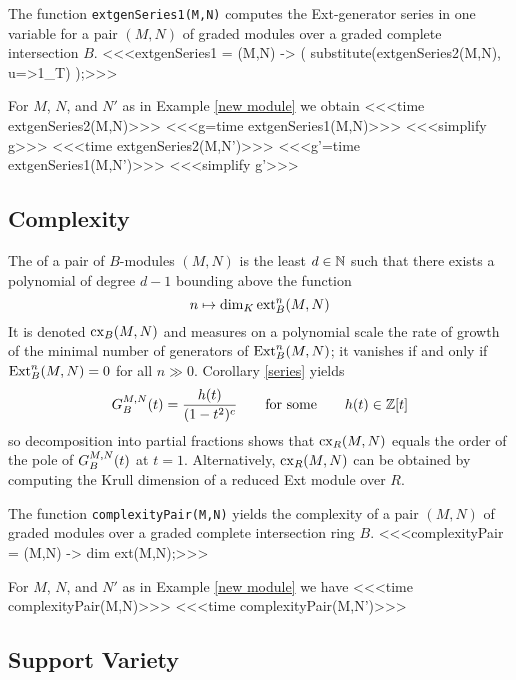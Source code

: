 \begin{sCode}
The function {\tt extgenSeries1(M,N)} computes the Ext-genera\-tor series in
one variable for a pair $(M,N)$ of graded modules over a graded complete
intersection $B$.
<<<extgenSeries1 = (M,N) -> (
   substitute(extgenSeries2(M,N), {u=>1_T})
   );>>>
\end{sCode}

\begin{sExample}
For $M$, $N$, and $N'$ as in Example \ref{new module} we obtain
<<<time extgenSeries2(M,N)>>>
<<<g=time extgenSeries1(M,N)>>>
<<<simplify g>>>
<<<time extgenSeries2(M,N')>>>
<<<g'=time extgenSeries1(M,N')>>>
<<<simplify g'>>>
\end{sExample}

\subsection{Complexity}

The {\it{}\/} of a pair of $B$-modules $(M,N)$
is the least $d\in{\mathbb N}$ such that there exists
a polynomial of degree $d-1$ bounding above the function
\[
n \mapsto \dim_K \operatorname{ext}^n_B(M,N)
\]
It is denoted $\operatorname{cx}_B(M,N)$ and measures on a polynomial scale the rate
of growth of the minimal number of generators of $\operatorname{Ext}^n_B(M,N)$; it
vanishes if and only if $\operatorname{Ext}^n_B(M,N)=0$ for all $n\gg0$.  Corollary
\ref{series} yields
\[
{G}^{M,N}_B(t)=\frac{h(t)}{(1-t^2)^c}
\qquad\text{for some}\qquad h(t)\in{\mathbb Z}[t]
\]
so decomposition into partial fractions shows that $\operatorname{cx}_R(M,N)$ equals
the order of the pole of ${G}^{M,N}_B(t)$ at $t=1$.  Alternatively,
$\operatorname{cx}_R(M,N)$ can be obtained by computing the Krull dimension of a
reduced Ext module over $R$.

\begin{sCode}
The function {\tt complexityPair(M,N)} yields the complexity of a pair
$(M,N)$ of graded modules over a graded complete intersection ring $B$.
<<<complexityPair = (M,N) -> dim ext(M,N);>>>
 \end{sCode}

\begin{sExample}
For $M$, $N$, and $N'$ as in Example \ref{new module} we have
<<<time complexityPair(M,N)>>>
<<<time complexityPair(M,N')>>>
\end{sExample}

\subsection{Support Variety}
\label{Support variety2}

